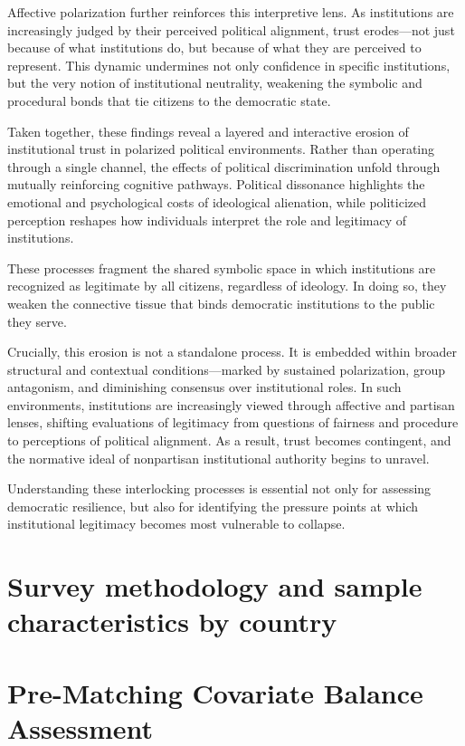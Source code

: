 \documentclass{article}
\begin{document}
Affective polarization further reinforces this interpretive lens. As institutions are increasingly judged by their perceived political alignment, trust erodes—not just because of what institutions do, but because of what they are perceived to represent. This dynamic undermines not only confidence in specific institutions, but the very notion of institutional neutrality, weakening the symbolic and procedural bonds that tie citizens to the democratic state.

Taken together, these findings reveal a layered and interactive erosion of institutional trust in polarized political environments. Rather than operating through a single channel, the effects of political discrimination unfold through mutually reinforcing cognitive pathways. Political dissonance highlights the emotional and psychological costs of ideological alienation, while politicized perception reshapes how individuals interpret the role and legitimacy of institutions.

These processes fragment the shared symbolic space in which institutions are recognized as legitimate by all citizens, regardless of ideology. In doing so, they weaken the connective tissue that binds democratic institutions to the public they serve.

Crucially, this erosion is not a standalone process. It is embedded within broader structural and contextual conditions—marked by sustained polarization, group antagonism, and diminishing consensus over institutional roles. In such environments, institutions are increasingly viewed through affective and partisan lenses, shifting evaluations of legitimacy from questions of fairness and procedure to perceptions of political alignment. As a result, trust becomes contingent, and the normative ideal of nonpartisan institutional authority begins to unravel.

Understanding these interlocking processes is essential not only for assessing democratic resilience, but also for identifying the pressure points at which institutional legitimacy becomes most vulnerable to collapse.

\newpage
\appendix
\section{Survey methodology and sample characteristics by country}
\label{appendix:a}


\newpage
\section{Pre-Matching Covariate Balance Assessment}
\label{appendix:b}

\end{document}

